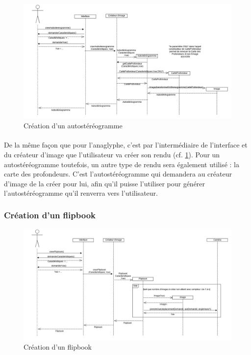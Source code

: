 \begin{figure}[h]
		\centering
		\includegraphics[scale=0.3]{creerstereogramme.jpg}
		\caption{\label{fig:creerAutostereogramme} Création d'un autostéréogramme}
\end{figure}

\paragraph{}
De la même façon que pour l’anaglyphe, c’est par l’intermédiaire de l’interface et du créateur d’image que l’utilisateur va créer son rendu (cf. \ref{fig:creerAutostereogramme}). Pour un autostéréogramme toutefois, un autre type de rendu sera également utilisé : la carte des profondeurs. C’est l’autostéréogramme qui demandera au créateur d’image de la créer pour lui, afin qu’il puisse l’utiliser pour générer l’autostéréogramme qu’il renverra vers l’utilisateur.

\newpage

\subsubsection{Création d'un flipbook}

\begin{figure}[h]
		\centering
		\includegraphics[scale=0.4]{creerflipbook.jpg}
		\caption{\label{fig:creerFlip} Création d'un flipbook}
\end{figure}

